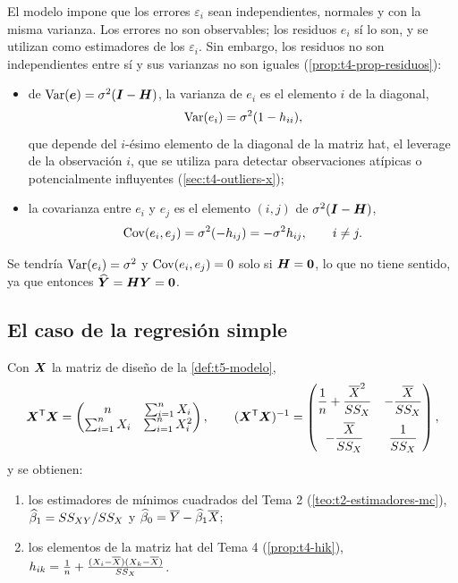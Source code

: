 El modelo impone que los errores $\varepsilon_i$ sean independientes, normales y con la misma
varianza. Los errores no son observables; los residuos $e_i$ sí lo son, y se utilizan como
estimadores de los $\varepsilon_i$. Sin embargo, los residuos no son independientes entre sí y sus
varianzas no son iguales (\cref{prop:t4-prop-residuos}):
\begin{itemize}
  \item de $\operatorname{Var}(\bm{e})=\sigma^2(\bm{I}-\bm{H})$, la varianza de $e_i$ es el elemento $i$ de
    la diagonal,
    \[
      \operatorname{Var}(e_i) = \sigma^2(1-h_{ii}),
    \]
    que depende del $i$-ésimo elemento de la diagonal de la matriz hat, el leverage de la
    observación $i$, que se utiliza para detectar observaciones atípicas o potencialmente
    influyentes (\cref{sec:t4-outliers-x});
  \item la covarianza entre $e_i$ y $e_j$ es el elemento $(i,j)$ de $\sigma^2(\bm{I}-\bm{H})$,
    \[
      \operatorname{Cov}(e_i,e_j) = \sigma^2(-h_{ij}) = -\sigma^2h_{ij}, \qquad i\neq j .
    \]
\end{itemize}
Se tendría $\operatorname{Var}(e_i)=\sigma^2$ y $\operatorname{Cov}(e_i,e_j)=0$ solo si $\bm{H}=\bm{0}$, lo que no tiene
sentido, ya que entonces $\widehat{\bm{Y}}=\bm{H}\bm{Y}=\bm{0}$.

\subsection{El caso de la regresión simple}

\begin{proposicion}
  Con $\bm{X}$ la matriz de diseño de la \cref{def:t5-modelo},
  \[
    \bm{X}^{\mathsf{T}}\bm{X} = \begin{pmatrix} n & \sum_{i=1}^{n} X_i\\ \sum_{i=1}^{n} X_i & \sum_{i=1}^{n} X_i^2 \end{pmatrix},
    \qquad
    (\bm{X}^{\mathsf{T}}\bm{X})^{-1} = \begin{pmatrix}
      \dfrac1n+\dfrac{\overline{X}^2}{SS_X} & -\dfrac{\overline{X}}{SS_X}\\[10pt]
      -\dfrac{\overline{X}}{SS_X} & \dfrac{1}{SS_X}
    \end{pmatrix},
  \]
  y se obtienen:
  \begin{enumerate}
    \item los estimadores de mínimos cuadrados del Tema 2 (\cref{teo:t2-estimadores-mc}),
      $\widehat{\beta}_1=SS_{XY}/SS_X$ y $\widehat{\beta}_0=\overline{Y}-\widehat{\beta}_1\overline{X}$;
    \item los elementos de la matriz hat del Tema 4 (\cref{prop:t4-hik}),
      $h_{ik}=\frac1n+\frac{(X_i-\overline{X})(X_k-\overline{X})}{SS_X}$.
  \end{enumerate}
\end{proposicion}

